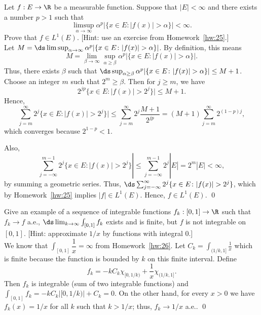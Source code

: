 \begin{hwsol}
Let $f: E \to \R$ be a measurable function. Suppose that $|E| < \infty$ and there exists a number $p > 1$ such that 
        \[
        \limsup_{\alpha \to \infty} \alpha^p |\{ x \in E \colon |f(x)| > \alpha \}| < \infty.
        \]
Prove that $f\in L^1(E)$. [Hint: use an exercise from Homework~\ref{hw:25}.] \\

\pf Let $M= \ds\limsup_{\alpha \to \infty} \alpha^p |\{ x \in E \colon |f(x)| > \alpha \}|$. By definition, this means
        \[
        M= \lim_{\beta \to \infty} \sup_{\alpha \geq \beta} \alpha^p |\{ x \in E \colon |f(x)| > \alpha \}|.
        \]
Thus, there exists $\beta$ such that $\ds\sup_{\alpha \geq \beta} \alpha^p |\{ x \in E \colon |f(x)| > \alpha \}| \leq M+1$. Choose an integer $m$ such that $2^m \geq \beta$. Then for $j \geq m$, we have 
        \[
        2^{jp} \{ x \in E \colon |f(x)| > 2^j \}| \leq M+1.
        \]
Hence,
        \[
        \sum_{j=m}^\infty 2^{j} \{ x \in E \colon |f(x)| > 2^j \}| \leq \sum_{j=m}^\infty 2^{j} \frac{M+1}{2^{jp}}= (M+1) \sum_{j=m}^\infty 2^{(1-p)j},
        \]
which converges because $2^{1-p}<1$. 

Also, 
        \[
        \sum_{j= -\infty}^{m-1} 2^{j} \{ x \in E \colon |f(x)| > 2^j \}| \leq \sum_{j= -\infty}^{m-1} 2^{j} |E|= 2^m |E| <\infty,
        \]
by summing a geometric series. Thus, $\ds\sum_{j= -\infty}^{\infty} 2^{j} \{ x \in E \colon |f(x)| > 2^j \}$, which by Homework~\ref{hw:25} implies $|f| \in L^1(E)$. Hence, $f \in L^1(E)$. \qed \\
\end{hwsol}


\begin{hwsol}
Give an example of a sequence of integrable functions $f_k: [0, 1] \to \R$ such that $f_k \to f$ a.e., $\ds\lim_{k \to \infty} \int_{[0,1]} f_k $ exists and is finite, but $f$ is not integrable on $[0, 1]$. [Hint: approximate $1/x$ by functions with integral $0$.] \\

\pf We know that $\int_{[0, 1]} \dfrac{1}{x}= \infty$ from Homework~\ref{hw:26}. Let $C_k= \int_{(1/k, 1]} \frac{1}{x}$ which is finite because the function is bounded by $k$ on this finite interval. Define 
        \[
        f_k= -k C_k \chi_{[0, 1/k) } + \dfrac{1}{x} \chi_{(1/k, 1]}.
        \]
Then $f_k$ is integrable (sum of two integrable functions) and $\int_{[0, 1]} f_k=  -k C_k |[0, 1/k)| + C_k= 0$. On the other hand, for every $x > 0$ we have $f_k(x)= 1/x$ for all $k$ such that $k > 1/x$; thus, $f_k \to 1/x$ a.e.. \qed \\
\end{hwsol}


